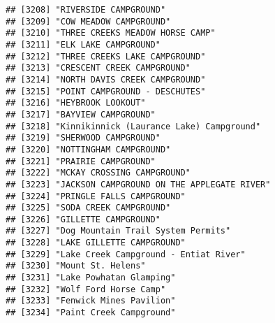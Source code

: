 \documentclass[
]{article}
\begin{document}
\begin{verbatim}
## [3208] "RIVERSIDE CAMPGROUND"                                                                
## [3209] "COW MEADOW CAMPGROUND"                                                               
## [3210] "THREE CREEKS MEADOW HORSE CAMP"                                                      
## [3211] "ELK LAKE CAMPGROUND"                                                                 
## [3212] "THREE CREEKS LAKE CAMPGROUND"                                                        
## [3213] "CRESCENT CREEK CAMPGROUND"                                                           
## [3214] "NORTH DAVIS CREEK CAMPGROUND"                                                        
## [3215] "POINT CAMPGROUND - DESCHUTES"                                                        
## [3216] "HEYBROOK LOOKOUT"                                                                    
## [3217] "BAYVIEW CAMPGROUND"                                                                  
## [3218] "Kinnikinnick (Laurance Lake) Campground"                                             
## [3219] "SHERWOOD CAMPGROUND"                                                                 
## [3220] "NOTTINGHAM CAMPGROUND"                                                               
## [3221] "PRAIRIE CAMPGROUND"                                                                  
## [3222] "MCKAY CROSSING CAMPGROUND"                                                           
## [3223] "JACKSON CAMPGROUND ON THE APPLEGATE RIVER"                                           
## [3224] "PRINGLE FALLS CAMPGROUND"                                                            
## [3225] "SODA CREEK CAMPGROUND"                                                               
## [3226] "GILLETTE CAMPGROUND"                                                                 
## [3227] "Dog Mountain Trail System Permits"                                                   
## [3228] "LAKE GILLETTE CAMPGROUND"                                                            
## [3229] "Lake Creek Campground - Entiat River"                                                
## [3230] "Mount St. Helens"                                                                    
## [3231] "Lake Powhatan Glamping"                                                              
## [3232] "Wolf Ford Horse Camp"                                                                
## [3233] "Fenwick Mines Pavilion"                                                              
## [3234] "Paint Creek Campground"                                                              

\end{verbatim}
\end{document}
